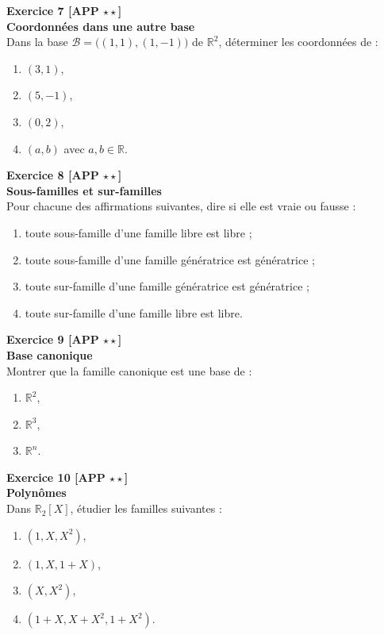 \documentclass[11pt,a4paper]{article}
\begin{document}
\textbf{Exercice 7 [APP $\star\star$]}\\
\textbf{Coordonnées dans une autre base}\\
Dans la base \(\mathcal B=\big((1,1),(1,-1)\big)\) de \(\mathbb{R}^2\), déterminer les coordonnées de :
\begin{enumerate}[label=\alph*)]
    \item \((3,1)\),
    \item \((5,-1)\),
    \item \((0,2)\),
    \item \((a,b)\) avec \(a,b\in\mathbb{R}\).
\end{enumerate}

\textbf{Exercice 8 [APP $\star\star$]}\\
\textbf{Sous-familles et sur-familles}\\
Pour chacune des affirmations suivantes, dire si elle est vraie ou fausse :
\begin{enumerate}[label=\alph*)]
    \item toute sous-famille d’une famille libre est libre ;
    \item toute sous-famille d’une famille génératrice est génératrice ;
    \item toute sur-famille d’une famille génératrice est génératrice ;
    \item toute sur-famille d’une famille libre est libre.
\end{enumerate}

\textbf{Exercice 9 [APP $\star\star$]}\\
\textbf{Base canonique}\\
Montrer que la famille canonique est une base de :
\begin{enumerate}[label=\alph*)]
    \item \(\mathbb{R}^2\),
    \item \(\mathbb{R}^3\),
    \item \(\mathbb{R}^n\).
\end{enumerate}

\textbf{Exercice 10 [APP $\star\star$]}\\
\textbf{Polynômes}\\
Dans \(\mathbb{R}_2[X]\), étudier les familles suivantes :
\begin{enumerate}[label=\alph*)]
    \item \((1,X,X^2)\),
    \item \((1,X,1+X)\),
    \item \((X,X^2)\),
    \item \((1+X, X+X^2, 1+X^2)\).
\end{enumerate}
\end{document}
